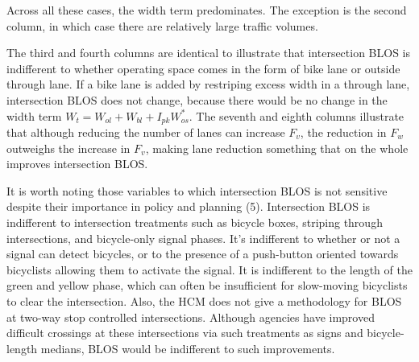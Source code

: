 \documentclass[11pt]{article} %
\begin{document}
Across all these cases, the width term predominates. The exception is the second column, in which case there are relatively large traffic volumes.

The third and fourth columns are identical to illustrate that intersection BLOS is indifferent to whether operating space comes in the form of bike lane or outside through lane. If a bike lane is added by restriping excess width in a through lane, intersection BLOS does not change, because there would be no change in the width term $W_t =W_{ol}+W_{bl}+I_{pk}W_{os}^*$. The seventh and eighth columns illustrate that although reducing the number of lanes can increase $F_v$, the reduction in $F_w$ outweighs the increase in $F_v$, making lane reduction something that on the whole improves intersection BLOS.  


It is worth noting those variables to which intersection BLOS is not sensitive despite their importance in policy and planning (5). Intersection BLOS is indifferent to intersection treatments such as bicycle boxes, striping through intersections, and bicycle-only signal phases. It's indifferent to whether or not a signal can detect bicycles, or to the presence of a push-button oriented towards bicyclists allowing them to activate the signal. It is indifferent to the length of the green and yellow phase, which can often be insufficient for slow-moving bicyclists to clear the intersection. Also, the HCM does not give a methodology for BLOS at two-way stop controlled intersections. Although agencies have improved difficult crossings at these intersections via such treatments as signs and bicycle-length medians, BLOS would be indifferent to such improvements.
\end{document}

